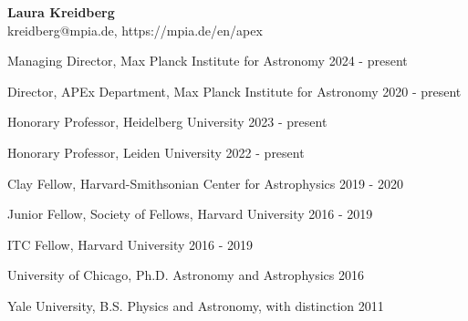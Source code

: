 \documentclass[12pt,letterpaper]{article}
\begin{document}
\thispagestyle{empty}\sloppy\sloppypar\raggedbottom

\textbf{\Large Laura Kreidberg}\\ 
\textsf{\small kreidberg@mpia.de, https://mpia.de/en/apex} \\[0.5ex]

\begin{list}{}{\cvlist}
    \item Managing Director, Max Planck Institute for Astronomy \hfill 2024 - present\\
    \item Director, APEx Department, Max Planck Institute for Astronomy \hfill 2020 - present \\
    \item Honorary Professor, Heidelberg University \hfill 2023 - present \\
    \item Honorary Professor, Leiden University \hfill 2022 - present \\
    \item Clay Fellow, Harvard-Smithsonian Center for Astrophysics \hfill 2019 - 2020\\
    \item Junior Fellow, Society of Fellows, Harvard University \hfill 2016 - 2019\\
    \item ITC Fellow, Harvard University \hfill 2016 - 2019\\

\end{list}


\begin{list}{}{\cvlist}
    \item University of Chicago, Ph.D. Astronomy and Astrophysics \hfill 2016
    \item Yale University, B.S. Physics and Astronomy, with distinction \hfill 2011
\end{list}
\end{document}
